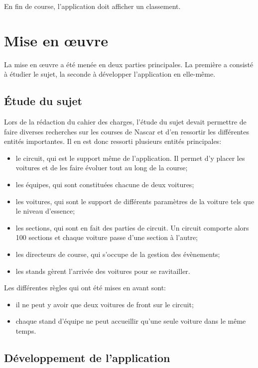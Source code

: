 \documentclass[a4paper, 11pt]{article}
\begin{document}
			En fin de course, l'application doit afficher un classement.
			
			
	\section{Mise en œuvre}
	
		La mise en œuvre a été menée en deux parties principales. La première a consisté à étudier le sujet, la seconde à développer l'application en elle-même. 
		
		\subsection{Étude du sujet}
		
		Lors de la rédaction du cahier des charges, l'étude du sujet devait permettre de faire diverses recherches sur les courses de Nascar et d'en ressortir les différentes entités importantes. Il en est donc ressorti plusieurs entités principales:
		\begin{itemize}
			\item le circuit, qui est le support même de l'application. Il permet d'y placer les voitures et de les faire évoluer tout au long de la course;
			\item les équipes, qui sont constituées chacune de deux voitures;
			\item les voitures, qui sont le support de différents paramètres de la voiture tels que le niveau d'essence;
			\item les sections, qui sont en fait des parties de circuit. Un circuit comporte alors 100 sections et chaque voiture passe d'une section à l'autre;
			\item les directeurs de course, qui s'occupe de la gestion des évènements;
			\item les stands gèrent l'arrivée des voitures pour se ravitailler.\\
		\end{itemize}
		
		Les différentes règles qui ont été mises en avant sont:
		\begin{itemize}
			\item il ne peut y avoir que deux voitures de front sur le circuit;
			\item chaque stand d'équipe ne peut accueillir qu'une seule voiture dans le même temps.
		\end{itemize}
		

		\subsection{Développement de l'application}
		
\end{document}
